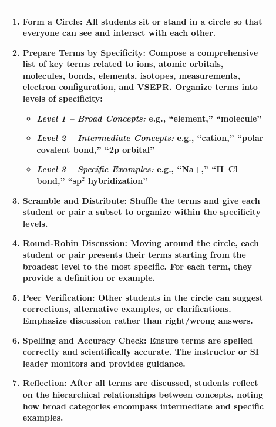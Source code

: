 \documentclass{article}
\begin{document}
\begin{tabular}{|p{0.9\linewidth}|}
\hline
\vspace{0.2cm}
\begin{enumerate}
    \item \textbf{Form a Circle:} All students sit or stand in a circle so that everyone can see and interact with each other.
    \item \textbf{Prepare Terms by Specificity:} Compose a comprehensive list of key terms related to ions, atomic orbitals, molecules, bonds, elements, isotopes, measurements, electron configuration, and VSEPR. Organize terms into levels of specificity:
    \begin{itemize}
        \item \textit{Level 1 – Broad Concepts:} e.g., “element,” “molecule”
        \item \textit{Level 2 – Intermediate Concepts:} e.g., “cation,” “polar covalent bond,” “2p orbital”
        \item \textit{Level 3 – Specific Examples:} e.g., “Na+,” “H–Cl bond,” “sp$^2$ hybridization”
    \end{itemize}
    \item \textbf{Scramble and Distribute:} Shuffle the terms and give each student or pair a subset to organize within the specificity levels.
    \item \textbf{Round-Robin Discussion:} Moving around the circle, each student or pair presents their terms starting from the broadest level to the most specific. For each term, they provide a definition or example.  
    \item \textbf{Peer Verification:} Other students in the circle can suggest corrections, alternative examples, or clarifications. Emphasize discussion rather than right/wrong answers.
    \item \textbf{Spelling and Accuracy Check:} Ensure terms are spelled correctly and scientifically accurate. The instructor or SI leader monitors and provides guidance.
    \item \textbf{Reflection:} After all terms are discussed, students reflect on the hierarchical relationships between concepts, noting how broad categories encompass intermediate and specific examples.
\end{enumerate} \\
\hline
\end{tabular}
\end{document}
